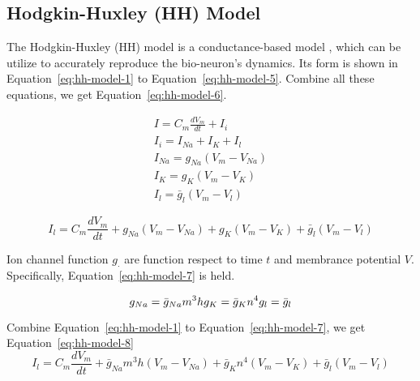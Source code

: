 \subsection{Hodgkin-Huxley (HH) Model}

The Hodgkin-Huxley (HH) model is a conductance-based model , which can be utilize to accurately 
reproduce the bio-neuron's dynamics. Its form is shown in Equation~\ref{eq:hh-model-1} to Equation~\ref{eq:hh-model-5}.
Combine all these equations, we get Equation~\ref{eq:hh-model-6}.

\begin{align}
    I = C_m\frac{dV_m}{dt} + I_{i} \label{eq:hh-model-1} \\
    I_i = I_{Na} + I_K + I_l \label{eq:hh-model-2}  \\
    I_{Na} = g_{Na}(V_m - V_{Na}) \label{eq:hh-model-3} \\
    I_K = g_{K}(V_m - V_{K}) \label{eq:hh-model-4}  \\
    I_l = \bar g_{l}(V_m - V_{l}) \label{eq:hh-model-5} 
\end{align}

\begin{equation}\label{eq:hh-model-6}
    I_l = C_m\frac{dV_m}{dt} + g_{Na}(V_m - V_{Na}) + g_{K}(V_m - V_{K}) + \bar g_{l}(V_m - V_{l})
\end{equation}

Ion channel function $g_{\cdot}$ are function respect to time $t$ and membrance potential $V$.
Specifically, Equation~\ref{eq:hh-model-7} is held.

\begin{equation}\label{eq:hh-model-7}
    g_{Na} = \bar g_{Na}m^3h \\
    g_{K} = \bar g_{K}n^4 \\
    g_{l} = \bar g_l \\
\end{equation}

Combine Equation~\ref{eq:hh-model-1} to Equation~\ref{eq:hh-model-7}, we get Equation~\ref{eq:hh-model-8}
\begin{equation}\label{eq:hh-model-8}
    I_l = C_m\frac{dV_m}{dt} + \bar g_{Na}m^3h(V_m - V_{Na}) + \bar g_{K}n^4(V_m - V_{K}) + \bar g_{l}(V_m - V_{l})
\end{equation}

